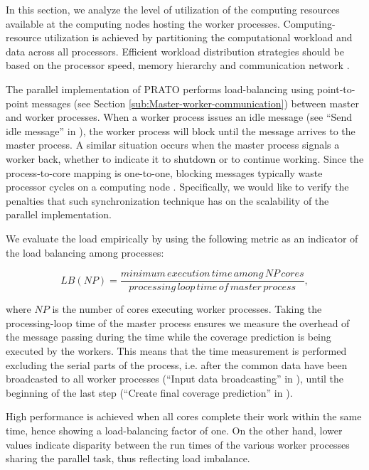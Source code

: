 In this section, we analyze the level of utilization of the computing
resources available at the computing nodes hosting the worker processes.
Computing-resource utilization is achieved by partitioning the computational
workload and data across all processors. Efficient workload distribution
strategies should be based on the processor speed, memory hierarchy
and communication network \cite{Clarke_Dynamic_load_balancing:2011}.

The parallel implementation of PRATO performs load-balancing using
point-to-point messages (see Section \ref{sub:Master-worker-communication})
between master and worker processes. When a worker process issues
an idle message (see ``Send idle message'' in ),
the worker process will block until the message arrives to the master
process. A similar situation occurs when the master process signals
a worker back, whether to indicate it to shutdown or to continue working.
Since the process-to-core mapping is one-to-one, blocking messages
typically waste processor cycles on a computing node \cite{Bhandarkar_Adaptive_load_balancing_for_MPI:2001}.
Specifically, we would like to verify the penalties that such synchronization
technique has on the scalability of the parallel implementation.

We evaluate the load empirically \cite{Watts_A_practical_approach_to_dynamic_load_balancing:1998}
by using the following metric as an indicator of the load balancing
among processes:

{\small 
\begin{equation}
LB(NP)=\frac{minimum\, execution\, time\, among\, NP\, cores}{processing\, loop\, time\, of\, master\, process},
\end{equation}
}{\small \par}

\noindent where $NP$ is the number of cores executing worker processes.
Taking the processing-loop time of the master process ensures we measure
the overhead of the message passing during the time while the coverage
prediction is being executed by the workers. This means that the time
measurement is performed excluding the serial parts of the process,
i.e. after the common data have been broadcasted to all worker processes
(``Input data broadcasting'' in ),
until the beginning of the last step (``Create final coverage prediction''
in ).

High performance is achieved when all cores complete their work within
the same time, hence showing a load-balancing factor of one. On the
other hand, lower values indicate disparity between the run times
of the various worker processes sharing the parallel task, thus reflecting
load imbalance.


